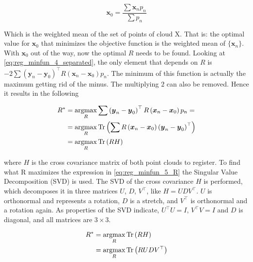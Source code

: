 \documentclass[../main.tex]{subfiles}
\begin{document}
\begin{equation}
    \boldsymbol{x}_{0}=\frac{\sum \boldsymbol{x}_{n} p_{n}}{\sum p_{n}}
\end{equation}

Which is the weighted mean of the set of points of cloud X. That is: the optimal value for $\boldsymbol{x}_{0}$ that minimizes the objective function is the weighted mean of $\{\boldsymbol{x}_{n}\}$. With $\boldsymbol{x}_{0}$ out of the way, now the optimal $R$ needs to be found. Looking at \ref{eq:reg_minfun_4_separated}, the only element that depends on $R$ is $-2 \sum\left(\boldsymbol{y}_{n}-\boldsymbol{y}_{0}\right)^{\top} R\left(\boldsymbol{x}_{n}-\boldsymbol{x}_{0}\right) p_{n}$. The minimum of this function is actually the maximum getting rid of the minus. The multiplying $2$ can also be removed. Hence it results in the following

\begin{equation} \label{eq:reg_minfun_5_R}
\begin{split}
    R^{*} &= \operatorname*{argmax}_{R} \sum\left(\boldsymbol{y}_{n}-\boldsymbol{y}_{0}\right)^{\top} R\left(\boldsymbol{x}_{n}-\boldsymbol{x}_{0}\right) p_{n} = \\
    &= \operatorname*{argmax}_{R}\operatorname{Tr}\left(\sum R \left(\boldsymbol{x}_{n}-\boldsymbol{x}_{0}\right) \left(\boldsymbol{y}_{n}-\boldsymbol{y}_{0}\right)^{\top}\right) \\
    &= \operatorname*{argmax}_{R}\operatorname{Tr} \left(RH\right)
\end{split}
\end{equation}

where $H$ is the cross covariance matrix of both point clouds to register. To find what R maximizes the expression in \ref{eq:reg_minfun_5_R} the Singular Value Decomposition (SVD) is used. The SVD of the cross covariance $H$ is performed, which decomposes it in three matrices $U$, $D$, $V^{\top}$, like $H=UDV^{\top}$. $U$ is orthonormal and represents a rotation, $D$ is a stretch, and $V^{\top}$ is orthonormal and a rotation again. As properties of the SVD indicate, $U^{\top}U=I$, $V^{\top}V=I$ and $D$ is diagonal, and all matrices are $3 \times 3$. 

\begin{equation} \label{eq:reg_minfun_6_R}
\begin{split}
    R^{*}&= \operatorname*{argmax}_{R}\operatorname{Tr} \left(RH\right)\\
    &= \operatorname*{argmax}_{R}\operatorname{Tr} \left(RUDV^{\top}\right)
\end{split}
\end{equation}
\end{document}
